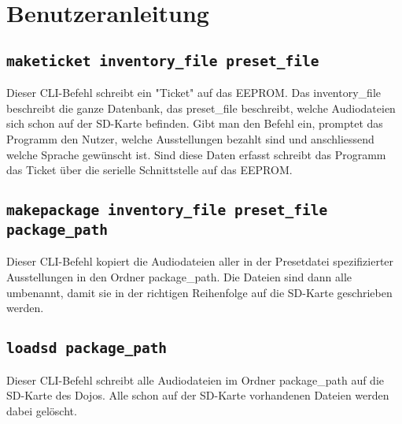 \section{Benutzeranleitung}
\subsection{\texttt{maketicket inventory\_file preset\_file}}
Dieser CLI-Befehl schreibt ein "Ticket" auf das EEPROM.
Das inventory\_file beschreibt die ganze Datenbank, 
das preset\_file beschreibt, welche Audiodateien sich schon auf der SD-Karte befinden.
Gibt man den Befehl ein, promptet das Programm den Nutzer, 
welche Ausstellungen bezahlt sind und anschliessend welche Sprache gewünscht ist.
Sind diese Daten erfasst schreibt das Programm das Ticket über die serielle Schnittstelle auf das EEPROM.
\subsection{\texttt{makepackage inventory\_file preset\_file package\_path}}
Dieser CLI-Befehl kopiert die Audiodateien aller in der Presetdatei spezifizierter Ausstellungen in den Ordner package\_path. 
Die Dateien sind dann alle umbenannt, damit sie in der richtigen Reihenfolge auf die SD-Karte geschrieben werden.
\subsection{\texttt{loadsd package\_path}}
Dieser CLI-Befehl schreibt alle Audiodateien im Ordner package\_path auf die SD-Karte des Dojos. Alle schon auf der SD-Karte vorhandenen Dateien werden dabei gelöscht.
